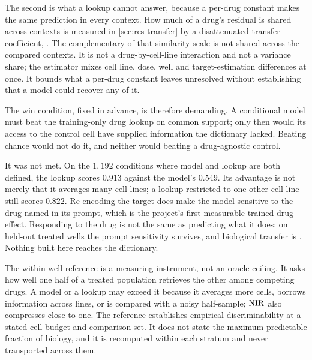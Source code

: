 The second is what a lookup cannot answer, because a per-drug constant makes the
same prediction in every context. How much of a drug's residual is shared across
contexts is measured in \cref{sec:res-transfer} by a disattenuated transfer
coefficient, . The complementary
 of that similarity scale is not shared across the
compared contexts. It is not a drug-by-cell-line interaction and not a variance
share; the estimator mixes cell line, dose, well and target-estimation
differences at once. It bounds what a per-drug constant leaves unresolved
without establishing that a model could recover any of it.

The win condition, fixed in advance, is therefore demanding. A
conditional model must beat the training-only drug lookup on common support;
only then would its access to the control cell have supplied information the
dictionary lacked. Beating chance would not do it, and neither would beating a
drug-agnostic control.

It was not met. On the $1{,}192$ conditions where model and lookup
are both defined, the lookup scores $0.913$ against the model's $0.549$. Its
advantage is not merely that it averages many cell lines; a lookup restricted to
one other cell line still scores $0.822$. Re-encoding the
target does make the model sensitive to the drug named in its prompt, which is
the project's first measurable trained-drug effect. Responding to the drug is
not the same as predicting what it does: on held-out treated wells the prompt
sensitivity survives, and biological transfer is \notestablished. Nothing built
here reaches the dictionary.

\begin{scopelimit}
The within-well reference is a measuring instrument, not an oracle ceiling. It
asks how well one half of a treated population retrieves the other among
competing drugs. A model or a lookup may exceed it because it averages more
cells, borrows information across lines, or is compared with a noisy half-sample;
$\textrm{NIR}$ also compresses close to one. The reference establishes empirical
discriminability at a stated cell budget and comparison set. It does not state
the maximum predictable fraction of biology, and it is recomputed within each
stratum and never transported across them.
\end{scopelimit}

